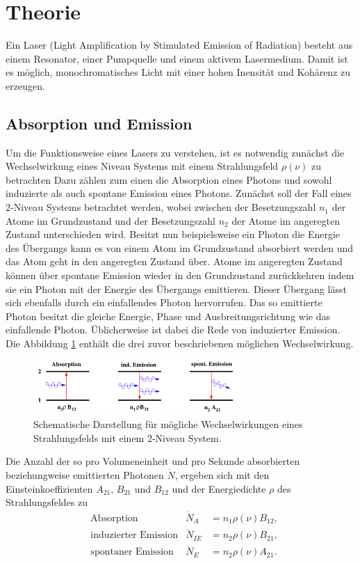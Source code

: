 \section{Theorie}
\label{sec:Theorie}
Ein Laser (Light Amplification by
Stimulated Emission of Radiation)
besteht aus einem Resonator,
einer Pumpquelle und einem aktivem Lasermedium.
Damit ist es möglich, monochromatisches Licht mit einer
hohen Inensität und Kohärenz zu erzeugen.

\subsection{Absorption und Emission}
\label{subsec:absorption_und_emission}
Um die Funktionsweise eines Lasers
zu verstehen, ist es notwendig zunächst
die Wechselwirkung eines Niveau Systems
mit einem Strahlungsfeld $\rho(\nu)$ zu betrachten
Dazu zählen zum einen die Absorption eines Photons
und sowohl induzierte als auch spontane Emission eines Photons.
Zunächst soll der Fall
eines 2-Niveau Systems betrachtet
werden, wobei zwischen der Besetzungszahl $n_1$
der Atome im Grundzustand
und der Besetzungszahl $n_2$
der Atome im angeregten
Zustand unterschieden wird.
Besitzt nun beispielsweise ein
Photon die Energie des Übergangs
kann es von einem Atom im Grundzustand
absorbiert werden und das Atom geht in den
angeregten Zustand über. Atome im angeregten
Zustand können über spontane Emission
wieder in den Grundzustand zurückkehren
indem sie ein Photon mit der Energie
des Übergangs emittieren.
Dieser Übergang lässt sich ebenfalls
durch ein einfallendes
Photon hervorrufen.
Das so emittierte Photon besitzt die gleiche
Energie, Phase und Ausbreitungsrichtung
wie das einfallende Photon.
Üblicherweise ist dabei die Rede von
induzierter Emission.
Die Abbildung \ref{fig:ab_em} enthält die drei
zuvor beschriebenen möglichen Wechselwirkung.
\begin{figure}
  \centering
  \includegraphics[width=0.7\textwidth]{figures/ab_und_emiss.PNG}
  \caption{Schematische Darstellung
  für mögliche Wechselwirkungen
   eines Strahlungsfelds
  mit einem 2-Niveau System. \cite{sample}}
  \label{fig:ab_em}
\end{figure}

Die Anzahl der so
pro Volumeneinheit und pro Sekunde
absorbierten beziehungweise emittierten Photonen $\dot{N}$,
ergeben sich mit den Einsteinkoeffizienten $A_21$, $B_21$ und $B_12$
und der Energiedichte $\rho$ des Strahlungsfeldes zu
\begin{align}
& \text{Absorption}   &\dot{N}_A   &= n_1 \rho(\nu)B_{12},\\
& \text{induzierter Emission}   &\dot{N}_{IE}&= n_2 \rho(\nu)B_{21},\\
& \text{spontaner Emission}   &\dot{N}_E   &= n_2 \rho(\nu) A_{21}.
\end{align}

